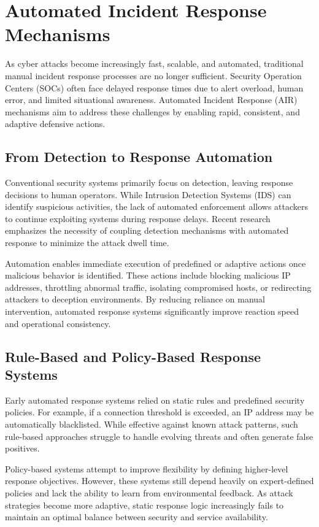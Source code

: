\documentclass[12pt,a4paper]{report}
\begin{document}
\section{Automated Incident Response Mechanisms}

As cyber attacks become increasingly fast, scalable, and automated, traditional manual incident response processes are no longer sufficient.
Security Operation Centers (SOCs) often face delayed response times due to alert overload, human error, and limited situational awareness.
Automated Incident Response (AIR) mechanisms aim to address these challenges by enabling rapid, consistent, and adaptive defensive actions.

\subsection{From Detection to Response Automation}

Conventional security systems primarily focus on detection, leaving response decisions to human operators.
While Intrusion Detection Systems (IDS) can identify suspicious activities, the lack of automated enforcement allows attackers to continue exploiting systems during response delays.
Recent research emphasizes the necessity of coupling detection mechanisms with automated response to minimize the attack dwell time.

Automation enables immediate execution of predefined or adaptive actions once malicious behavior is identified.
These actions include blocking malicious IP addresses, throttling abnormal traffic, isolating compromised hosts, or redirecting attackers to deception environments.
By reducing reliance on manual intervention, automated response systems significantly improve reaction speed and operational consistency.

\subsection{Rule-Based and Policy-Based Response Systems}

Early automated response systems relied on static rules and predefined security policies.
For example, if a connection threshold is exceeded, an IP address may be automatically blacklisted.
While effective against known attack patterns, such rule-based approaches struggle to handle evolving threats and often generate false positives.

Policy-based systems attempt to improve flexibility by defining higher-level response objectives.
However, these systems still depend heavily on expert-defined policies and lack the ability to learn from environmental feedback.
As attack strategies become more adaptive, static response logic increasingly fails to maintain an optimal balance between security and service availability.
\end{document}
